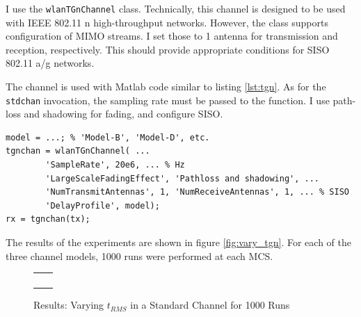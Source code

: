 I use the \texttt{wlanTGnChannel} class. Technically, this channel is designed to be used with IEEE 802.11 n high-throughput networks. However, the class supports configuration of \gls{MIMO} streams. I set those to 1 antenna for transmission and reception, respectively. This should provide appropriate conditions for \gls{SISO} 802.11 a/g networks.

The channel is used with Matlab code similar to listing \ref{lst:tgn}. As for the \texttt{stdchan} invocation, the sampling rate must be passed to the function. I use path-loss and shadowing for fading, and configure \gls{SISO}.

\begin{lstlisting}[captionpos=b,caption={Matlab wlanTGnChannel Simulation},label=lst:tgn]
model = ...; % 'Model-B', 'Model-D', etc.
tgnchan = wlanTGnChannel( ...
        'SampleRate', 20e6, ... % Hz
        'LargeScaleFadingEffect', 'Pathloss and shadowing', ...
        'NumTransmitAntennas', 1, 'NumReceiveAntennas', 1, ... % SISO
        'DelayProfile', model);
rx = tgnchan(tx);
\end{lstlisting}

The results of the experiments are shown in figure \ref{fig:vary_tgn}. For each of the three channel models, 1000 runs were performed at each \gls{MCS}.

\begin{figure}[p]
	\centering
	\setlength\figureheight{3cm}
	\setlength{}
	\begin{tabular}{cc}
		\subfloat[MCS 0]{} &
		\subfloat[MCS 1]{} \\
		\subfloat[MCS 2]{} &
		\subfloat[MCS 3]{} \\
		\subfloat[MCS 4]{} &
		\subfloat[MCS 5]{} \\
		\subfloat[MCS 6]{} &
		\subfloat[MCS 7]{} \\
	\end{tabular}
	\caption{Results: Varying $t_{RMS}$ in a Standard Channel for 1000 Runs}
	\label{fig:vary_trms}
\end{figure}

